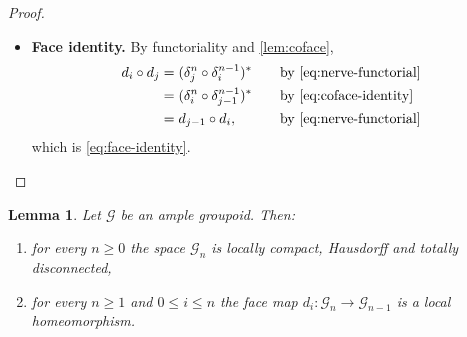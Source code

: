 \documentclass{extracta-temp-26}
\numberwithin{equation}{section}
\newtheorem{lem}[teo]{Lemma}
\theoremstyle{definition}
\theoremstyle{remark}
\newcommand{\G}{\mathcal{G}}
\newcommand{\step}[1]{\textbf{#1}}
\begin{document}
\begin{proof}
\begin{itemize}
\begin{equation}
\begin{aligned}
&=(\theta\circ\theta')^*(g),&&\quad\text{by \eqref{eq:nerve-structure}}
\end{aligned}
\end{equation}
and for \(l=0\) likewise \(\theta'^*(h)=x_{\theta'(0)}(h)=x_{\theta\theta'(0)}(g)=(\theta\circ\theta')^*(g)\).
\item \step{Face identity.}
By functoriality and \cref{lem:coface},
\begin{equation}\label{eq:face-identity-proof}
\begin{aligned}
d_i\circ d_j
&=(\delta^{n}_j\circ\delta^{n-1}_i)^*&&\quad\text{by \eqref{eq:nerve-functorial}}\\
&=(\delta^{n}_i\circ\delta^{n-1}_{j-1})^*&&\quad\text{by \eqref{eq:coface-identity}}\\
&=d_{j-1}\circ d_i,&&\quad\text{by \eqref{eq:nerve-functorial}}
\end{aligned}
\end{equation}
which is \eqref{eq:face-identity}.\qedhere
\end{itemize}
\end{proof}

\begin{lem}\label{lem:nervefacts}
Let \(\G\) be an ample groupoid. Then:
\begin{enumerate}
\item\label{it:nerve-lch} for every \(n\ge 0\) the space \(\G_n\) is locally compact, Hausdorff and totally disconnected,
\item\label{it:nerve-face} for every \(n\ge 1\) and \(0\le i\le n\) the face map \(d_i\colon\G_n\to\G_{n-1}\) is a local homeomorphism.
\end{enumerate}
\end{lem}
\end{document}
